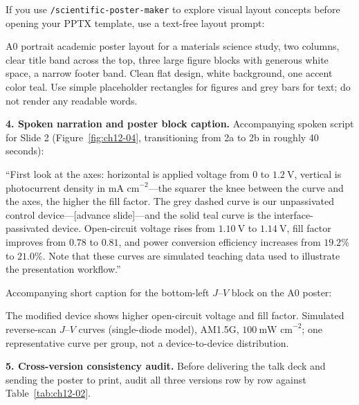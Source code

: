 If you use \texttt{/scientific-poster-maker} to explore visual layout concepts before opening your PPTX template, use a text-free layout prompt:
\begin{Prompt}
A0 portrait academic poster layout for a materials science study, two columns,
clear title band across the top, three large figure blocks with generous white
space, a narrow footer band. Clean flat design, white background, one accent
color teal. Use simple placeholder rectangles for figures and grey bars for
text; do not render any readable words.
\end{Prompt}

\textbf{4. Spoken narration and poster block caption.} Accompanying spoken script for Slide 2 (Figure~\ref{fig:ch12-04}, transitioning from 2a to 2b in roughly 40 seconds):
\begin{BookNote}
``First look at the axes: horizontal is applied voltage from $0$ to $1.2\ \text{V}$, vertical is photocurrent density in $\text{mA cm}^{-2}$---the squarer the knee between the curve and the axes, the higher the fill factor. The grey dashed curve is our unpassivated control device---[advance slide]---and the solid teal curve is the interface-passivated device. Open-circuit voltage rises from $1.10\ \text{V}$ to $1.14\ \text{V}$, fill factor improves from $0.78$ to $0.81$, and power conversion efficiency increases from $19.2\%$ to $21.0\%$. Note that these curves are simulated teaching data used to illustrate the presentation workflow.''
\end{BookNote}

Accompanying short caption for the bottom-left $J\text{--}V$ block on the A0 poster:
\begin{BookNote}
The modified device shows higher open-circuit voltage and fill factor. Simulated reverse-scan $J\text{--}V$ curves (single-diode model), AM1.5G, $100\ \text{mW cm}^{-2}$; one representative curve per group, not a device-to-device distribution.
\end{BookNote}

\textbf{5. Cross-version consistency audit.} Before delivering the talk deck and sending the poster to print, audit all three versions row by row against Table~\ref{tab:ch12-02}.

